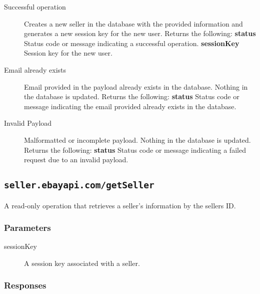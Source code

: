 \documentclass{article}
\newcommand{\code}[1]{\colorbox{light-gray}{\texttt{#1}}}
\begin{document}
\begin{description}
    \item[Successful operation] Creates a new seller in the database with the
        provided information and generates a new session key for the new user.
        Returns the following:
        \subitem\textbf{status} Status code or message indicating a successful operation.
        \subitem\textbf{sessionKey} Session key for the new user.

    \item[Email already exists] Email provided in the payload already exists in
        the database. Nothing in the database is updated. Returns the following:
        \subitem\textbf{status} Status code or message indicating the email
        provided already exists in the database.

    \item[Invalid Payload] Malformatted or incomplete payload. Nothing
        in the database is updated. Returns the following:
        \subitem\textbf{status} Status code or message indicating a failed
        request due to an invalid payload.

\end{description}

\subsection{\code{seller.ebayapi.com/getSeller}}
A read-only operation that retrieves a seller's information by the sellers ID.

\subsubsection{Parameters}

\begin{description}
    \item[sessionKey] A session key associated with a seller.
\end{description}

% 

\subsubsection{Responses}
\end{document}
